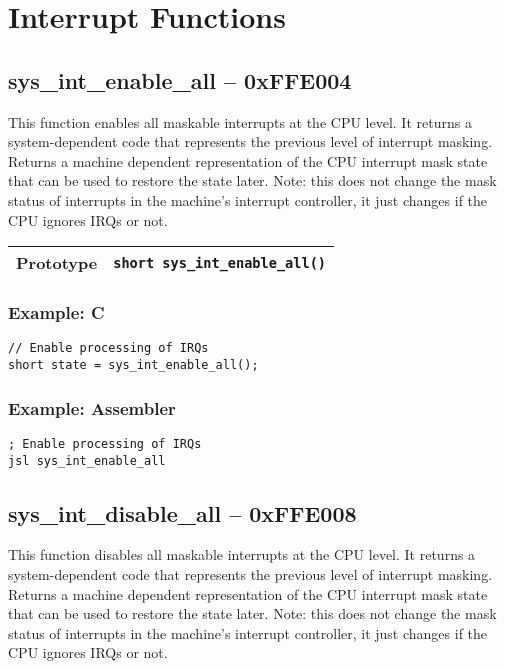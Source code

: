 \section{Interrupt Functions}

\subsection*{sys\_int\_enable\_all -- 0xFFE004}
This function enables all maskable interrupts at the CPU level. It returns a system-dependent code that represents the previous level of interrupt masking.
Returns a machine dependent representation of the CPU interrupt mask state that can be used to restore the state later.
Note: this does not change the mask status of interrupts in the machine's interrupt controller, it just changes if the CPU ignores IRQs or not.

\bigskip

\begin{tabular}{|l||l|} \hline
Prototype & \lstinline!short sys_int_enable_all()! \\ \hline
\end{tabular}

\subsubsection*{Example: C}
\begin{lstlisting}
// Enable processing of IRQs
short state = sys_int_enable_all();
\end{lstlisting}

\subsubsection*{Example: Assembler}
\begin{verbatim}
; Enable processing of IRQs
jsl sys_int_enable_all
\end{verbatim}

\subsection*{sys\_int\_disable\_all -- 0xFFE008}
This function disables all maskable interrupts at the CPU level. It returns a system-dependent code that represents the previous level of interrupt masking. 
Returns a machine dependent representation of the CPU interrupt mask state that can be used to restore the state later.
Note: this does not change the mask status of interrupts in the machine's interrupt controller, it just changes if the CPU ignores IRQs or not.

